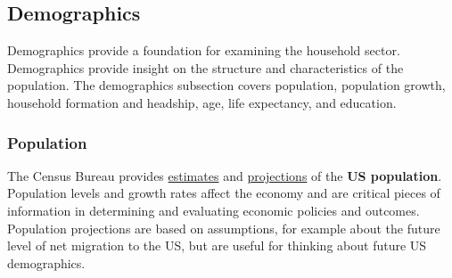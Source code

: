 \documentclass{report}
\begin{document}
{\begin{minipage}{0.76\textwidth}
\hypertarget{hhdem}{\label{hhdem}}
\subsection*{Demographics} 
\vspace{-1.0mm}

\small Demographics provide a foundation for examining the household sector. Demographics provide insight on the structure and characteristics of the population. The demographics subsection covers population, population growth, household formation and headship, age, life expectancy, and education.

\subsubsection*{Population} 
\small The Census Bureau provides \href{https://www.census.gov/programs-surveys/popest.html}{estimates} and \href{https://www.census.gov/programs-surveys/popproj.html}{projections} of the \textbf{US population}. Population levels and growth rates affect the economy and are critical pieces of information in determining and evaluating economic policies and outcomes. Population projections are based on assumptions, for example about the future level of net migration to the US, but are useful for thinking about future US demographics.


\vspace{1mm}


\end{minipage}}
\end{document}
